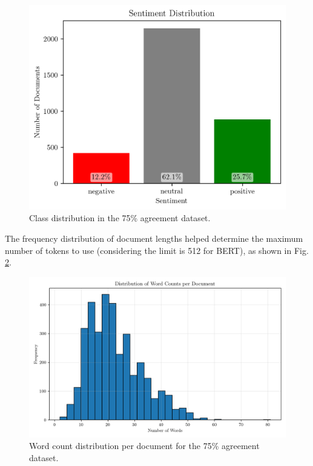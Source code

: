 \documentclass[conference]{IEEEtran}
\begin{document}
\begin{figure}[H]
    \centering
    \includegraphics[width=1\linewidth]{assets/sentiment_distribution.png}
    \caption{Class distribution in the 75\% agreement dataset.}
    \label{fig:sentiment_distribution}
\end{figure}

The frequency distribution of document lengths helped determine the maximum number of tokens to use (considering the limit is 512 for BERT), as shown in Fig. \ref{fig:word_count_distribution}.

\begin{figure}[H]
    \centering
    \includegraphics[width=1\linewidth]{assets/word_count_distribution.png}
    \caption{Word count distribution per document for the 75\% agreement dataset.}
    \label{fig:word_count_distribution}
\end{figure}
\end{document}
